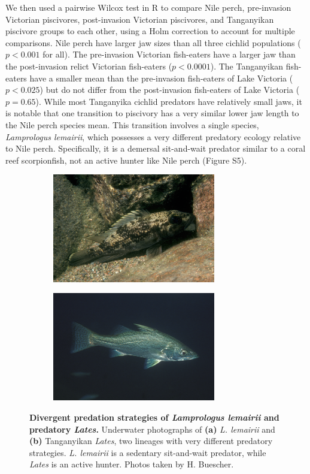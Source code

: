 We then used a pairwise Wilcox test in R to compare Nile perch, pre-invasion Victorian piscivores, post-invasion Victorian piscivores, and Tanganyikan piscivore groups to each other, using a Holm correction to account for multiple comparisons. Nile perch have larger jaw sizes than all three cichlid populations ($p<0.001$ for all). The pre-invasion Victorian fish-eaters have a larger jaw than the post-invasion relict Victorian fish-eaters ($p<0.0001$). The Tanganyikan fish-eaters have a smaller mean than the pre-invasion fish-eaters of Lake Victoria ($p<0.025$) but do not differ from the post-invasion fish-eaters of Lake Victoria ($p=0.65$). While most Tanganyika cichlid predators have relatively small jaws, it is notable that one transition to piscivory has a very similar lower jaw length to the Nile perch species mean. This transition involves a single species, {\em Lamprologus lemairii}, which possesses a very different predatory ecology relative to Nile perch. Specifically, it is a demersal sit-and-wait predator similar to a coral reef scorpionfish, not an active hunter like Nile perch (Figure S5). 

\begin{figure}
    \centering
    \begin{subfigure}[t]{2.8in}
        \includegraphics[width=2.8in]{FishJaws/figures/fig8a}
    \end{subfigure}
    \begin{subfigure}[t]{2.8in}
        \includegraphics[width=2.8in]{FishJaws/figures/fig8b}
    \end{subfigure}
    \caption{\textbf{Divergent predation strategies of {\em Lamprologus lemairii} and predatory {\em Lates}.} Underwater photographs of \textbf{(a)} {\em L. lemairii} and \textbf{(b)} Tanganyikan {\em Lates}, two lineages with very different predatory strategies. {\em L. lemairii} is a sedentary sit-and-wait predator, while {\em Lates} is an active hunter. Photos taken by H. Buescher.}
    \label{FJ_fig8}
\end{figure}



\clearpage

\clearpage

\clearpage

\clearpage

\clearpage

\clearpage
